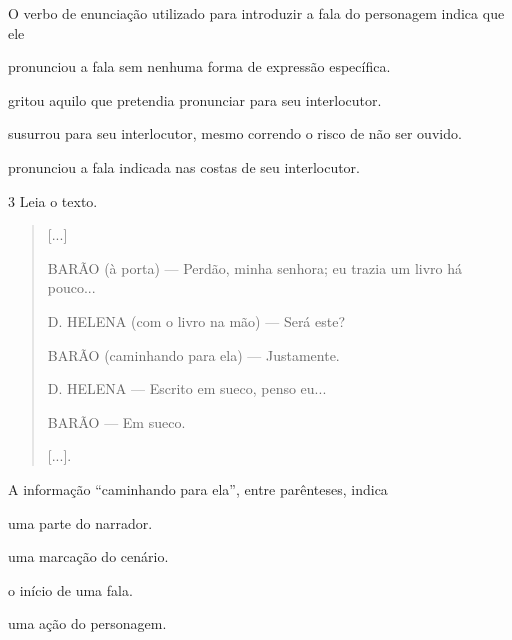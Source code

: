 O verbo de enunciação utilizado para introduzir a fala do personagem indica que ele

\begin{escolha}
\item pronunciou a fala sem nenhuma forma de expressão específica.

\item gritou aquilo que pretendia pronunciar para seu interlocutor.

\item susurrou para seu interlocutor, mesmo correndo o risco de não ser ouvido.

\item pronunciou a fala indicada nas costas de seu interlocutor.
\end{escolha}


\num{3} Leia o texto.

\begin{quote}
{[}...{]}

BARÃO (à porta) --- Perdão, minha senhora; eu trazia um livro há
pouco...

D. HELENA (com o livro na mão) --- Será este?

BARÃO (caminhando para ela) --- Justamente.

D. HELENA --- Escrito em sueco, penso eu...

BARÃO --- Em sueco.

{[}...{]}.
\end{quote}


A informação “caminhando para ela”, entre parênteses, indica

\begin{minipage}{.5\textwidth}
\begin{escolha}
\item uma parte do narrador.

\item uma marcação do cenário.

\item o início de uma fala.

\item uma ação do personagem.
\end{escolha}
\end{minipage}

